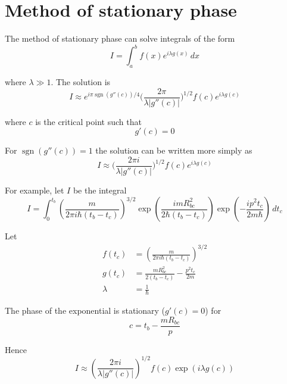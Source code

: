

\section*{Method of stationary phase}
The method of stationary phase can solve
integrals of the form
$$
I=\int_a^b f(x)e^{i\lambda g(x)}\,dx
$$

where $\lambda\gg1$.
The solution is
$$
I\approx e^{i\pi\operatorname{sgn}(g''(c))/4}
\biggl(\frac{2\pi}{\lambda|g''(c)|}\biggr)^{1/2}
f(c)e^{i\lambda g(c)}
$$

where $c$ is the critical point such that
$$
g'(c)=0
$$

For $\operatorname{sgn}(g''(c))=1$ the solution
can be written more simply as
$$
I\approx
\biggl(\frac{2\pi i}{\lambda|g''(c)|}\biggr)^{1/2}
f(c)e^{i\lambda g(c)}
$$

For example, let $I$ be the integral
$$
I=\int_0^{t_b}
\left(\frac{m}{2\pi i\hbar(t_b-t_c)}\right)^{3/2}
\exp\left(\frac{imR_{bc}^2}{2\hbar(t_b-t_c)}\right)
\exp\left(-\frac{ip^2t_c}{2m\hbar}\right)
\,dt_c
$$

Let
\begin{align*}
f(t_c)&=\left(\frac{m}{2\pi i\hbar(t_b-t_c)}\right)^{3/2}
\\
g(t_c)&=\frac{m R_{bc}^2}{2(t_b-t_c)}-\frac{p^2t_c}{2m}
\\
\lambda&=\frac{1}{\hbar}
\end{align*}

The phase of the exponential is stationary ($g'(c)=0$) for
$$
c=t_b-\frac{mR_{bc}}{p}
$$

Hence
\begin{equation*}
I\approx\left(\frac{2\pi i}{\lambda|g''(c)|}\right)^{1/2}
f(c)\exp(i\lambda g(c))
\end{equation*}


